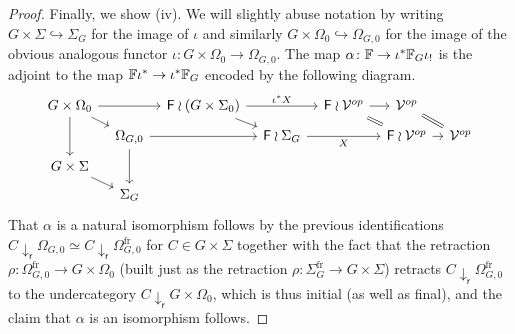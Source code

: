 \documentclass[a4paper,10pt]{article}%
\begin{document}
\begin{proof}
Finally, we show (iv). We will slightly abuse notation by writing 
$G \times \Sigma \hookrightarrow \Sigma_G$ for the image of $\iota$
and similarly
$G \times \Omega_0 \hookrightarrow \Omega_{G,0}$ for the image of the obvious analogous functor
$\iota \colon G \times \Omega_0 \to \Omega_{G,0}$.
The map 
$\alpha \colon \mathbb{F} \to \iota^{\**} \mathbb{F}_G \iota_{!}$
is the adjoint to the map 
$\mathbb{F} \iota^{\**} \to \iota^{\**} \mathbb{F}_G$ encoded by the following diagram.
\begin{equation}\label{MONADEQUIV DEF}
\begin{tikzcd}[row sep=5pt, column sep =8pt]
	G \times \Omega_0	\ar{dd} \ar{rd} \ar{rr} &&
	\Fin \wr (G \times \Sigma_0) \ar{rd}  \ar{rr}{\iota^{\**} X}&&
	\Fin \wr \mathcal{V}^{op} \ar{r} \ar[equal]{rd}&
	\mathcal{V}^{op} \ar[equal]{rd}
\\
	& \Omega_{G,0} \ar{dd} \ar{rr} &&
	\Fin \wr \Sigma_G  \ar{rr}[swap]{X} &&
	\Fin \wr \mathcal{V}^{op} \ar{r} &
	\mathcal{V}^{op}
\\
	G \times \Sigma \ar{rd} 
\\
	& \Sigma_G
\end{tikzcd}
\end{equation}
That 
$\alpha$
is a natural isomorphism
follows by the previous identifications 
$C \downarrow_{\mathsf{r}} \Omega_{G,0} \simeq
C \downarrow_{\mathsf{r}} \Omega_{G,0}^{\text{fr}}$
for $C \in G \times \Sigma$
together with the fact that the retraction 
$\rho \colon \Omega_{G,0}^{\text{fr}} \to G \times \Omega_0$
(built just as the retraction
$\rho \colon \Sigma_G^{\text{fr}} \to G \times \Sigma$)
retracts 
$C \downarrow_{\mathsf{r}} \Omega_{G,0}^{\text{fr}}$
to the undercategory
$C \downarrow_{\mathsf{r}} G \times \Omega_0$, which is thus initial (as well as final), and the claim that $\alpha$ is an isomorphism follows.


\end{proof}
\end{document}
